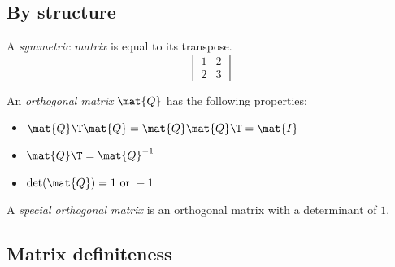 \subsection{By structure}

A \textit{symmetric matrix} is equal to its transpose.
\begin{equation*}
  \begin{bmatrix}
    1 & 2 \\
    2 & 3
  \end{bmatrix}
\end{equation*}

An \textit{orthogonal matrix} $\mat{Q}$ has the following properties:
\begin{itemize}
  \item $\mat{Q}\T\mat{Q} = \mat{Q}\mat{Q}\T = \mat{I}$
  \item $\mat{Q}\T = \mat{Q}^{-1}$
  \item $\det(\mat{Q}) = 1 \text{ or } -1$
\end{itemize}

A \textit{special orthogonal matrix} is an orthogonal matrix with a determinant
of $1$.

\subsection{Matrix definiteness}

